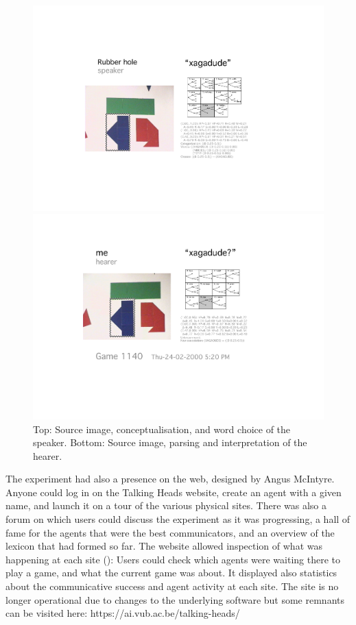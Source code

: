 \begin{figure}[htbp]
 \centerline{\includegraphics[width=.80\textwidth]{chap8/figures/xagadu-speaker.pdf}}
\centerline{\includegraphics[width=.80\textwidth]{chap8/figures/xagadu-hearer.pdf}}
\caption{\label{fig:interaction}Top: Source image, conceptualisation, and word choice of the speaker. Bottom: Source image, parsing and interpretation 
of the hearer.}
\end{figure}

The experiment had also a presence on the web, designed by Angus McIntyre. Anyone could log in on the 
Talking Heads website, create an agent with 
a given name, and launch it on a tour of the various physical sites. There was also a forum on which users could discuss
the experiment as it was progressing, a hall of fame for the agents that were the best communicators, and 
an overview of the lexicon 
that had formed so far. The website allowed inspection of what was happening at each site (): 
Users could check which agents were waiting there to play a game, and what the current 
game was about. It displayed also statistics about the 
communicative success and agent activity at each site. The site is no longer operational due to 
changes to the underlying software but some remnants can be visited here: https://ai.vub.ac.be/talking-heads/

